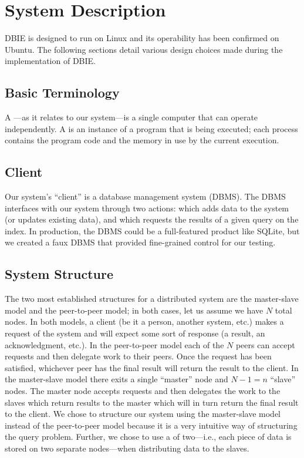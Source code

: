 \section{System Description}
DBIE is designed to run on Linux and its operability has been confirmed on
Ubuntu. The following sections detail various design choices made during the
implementation of DBIE.
%
\subsection{Basic Terminology}
A ---as it relates to our system---is a single computer that can
operate independently. A  is an instance of a program that is
being executed; each process contains the program code and the memory in use by
the current execution.
\subsection{Client}
Our system's ``client'' is a database management system (DBMS). The DBMS
interfaces with our system through two actions:  which adds data to
the system (or updates existing data), and  which requests the
results of a given query on the index. In production, the DBMS could be a
full-featured product like SQLite, but we created a faux DBMS that provided
fine-grained control for our testing.
%
\subsection{System Structure}
The two most established structures for a distributed system are the
master-slave model and the peer-to-peer model; in both cases, let us assume we
have \(N\) total nodes. In both models, a client (be it a person, another
system, etc.) makes a request of the system and will expect some sort of
response (a result, an acknowledgment, etc.). In the peer-to-peer model each of
the \(N\) peers can accept requests and then delegate work to their peers. Once
the request has been satisfied, whichever peer has the final result will return
the result to the client. In the master-slave model there exits a single
``master'' node and \(N - 1 = n\) ``slave'' nodes. The master node accepts
requests and then delegates the work to the slaves which return results to the
master which will in turn return the final result to the client. We chose to
structure our system using the master-slave model instead of the peer-to-peer
model because it is a very intuitive way of structuring the query problem.
Further, we chose to use a  of two---i.e., each piece
of data is stored on two separate nodes---when distributing data to the slaves.
%
